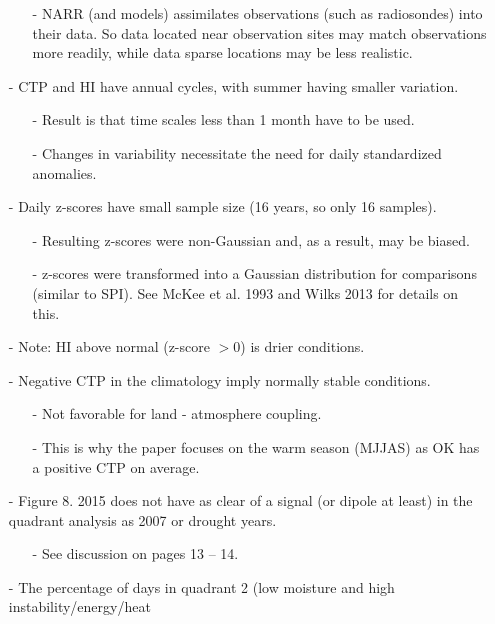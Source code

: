 \documentclass[12pt, letterpaper]{article}
\begin{document}
\begin{itemize}
        \begin{itemize}
        	\item[-] NARR (and models) assimilates observations (such as radiosondes) into their data.
        	         So data located near observation sites may match observations more readily, while
        	         data sparse locations may be less realistic.
        \end{itemize}
        \item[-] CTP and HI have annual cycles, with summer having smaller variation.
        \begin{itemize}
        	\item[-] Result is that time scales less than 1 month have to be used.
        	\item[-] Changes in variability necessitate the need for daily standardized anomalies.
        \end{itemize}
        \item[-] Daily z-scores have small sample size (16 years, so only 16 samples).
        \begin{itemize}
        	\item[-] Resulting z-scores were non-Gaussian and, as a result, may be biased.
        	\item[-] z-scores were transformed into a Gaussian distribution for comparisons (similar to
        	         SPI). See McKee et al. 1993 and Wilks 2013 for details on this.
        \end{itemize}
        \item[-] Note: HI above normal (z-score $> 0$) is drier conditions.
        \item[-] Negative CTP in the climatology imply normally stable conditions.
        \begin{itemize}
        	\item[-] Not favorable for land - atmosphere coupling.
        	\item[-] This is why the paper focuses on the warm season (MJJAS) as OK has a positive CTP
        	         on average.
        \end{itemize}
        \item[-] Figure 8. 2015 does not have as clear of a signal (or dipole at least) in the quadrant
                 analysis as 2007 or drought years.
        \begin{itemize}
        	\item[-] See discussion on pages 13 -- 14.
        \end{itemize}
        \item[-] The percentage of days in quadrant 2 (low moisture and high instability/energy/heat

\end{itemize}
\end{document}
